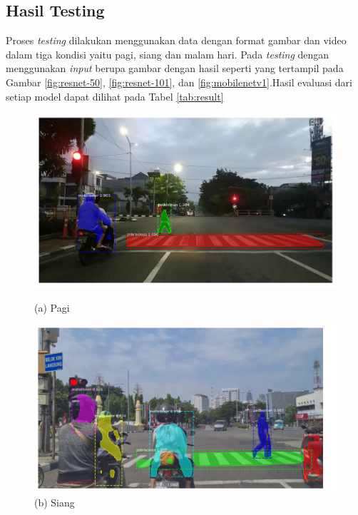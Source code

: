 \documentclass[conference]{IEEEtran}
\begin{document}
	\subsection{Hasil Testing}
	\vspace{1ex}
	Proses \textit{testing} dilakukan menggunakan data dengan format gambar dan video dalam tiga kondisi yaitu pagi, siang dan malam hari. Pada \textit{testing} dengan menggunakan \textit{input} berupa gambar dengan hasil seperti yang tertampil pada Gambar \ref{fig:resnet-50}, \ref{fig:resnet-101}, dan \ref{fig:mobilenetv1}.Hasil evaluasi dari setiap model dapat dilihat pada Tabel \ref{tab:result}
	\vspace{1ex}
	\begin{figure}[h]
		\centering
		\begin{minipage}[b]{0.2\textwidth}
			\includegraphics[width=\textwidth]{img/fajar-frame800-resnet50.png}
			\caption*{(a) Pagi}
		\end{minipage}
		\hfill
		\begin{minipage}[b]{0.2\textwidth}
			\includegraphics[width=\textwidth]{img/siang-frame465-resnet50.png}
			\caption*{(b) Siang}

\end{minipage}
\end{figure}
\end{document}
